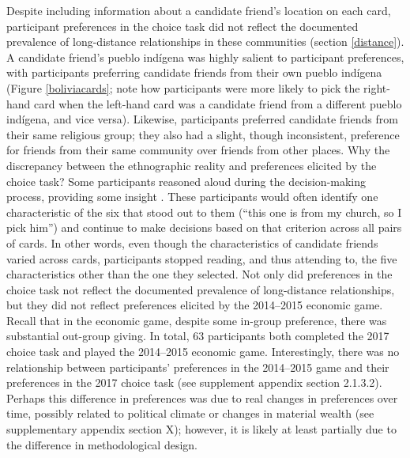 \documentclass[bibauthoryear]{aa}
\begin{document}
	Despite including information about a candidate friend's location on each card, participant preferences in the choice task did not reflect the documented prevalence of long-distance relationships in these communities (section \ref{distance}). A candidate friend's pueblo ind\'igena was highly salient to participant preferences, with participants preferring candidate friends from their own pueblo ind\'igena (Figure \ref{boliviacards}; note how participants were more likely to pick the right-hand card when the left-hand card was a candidate friend from a different pueblo ind\'igena, and vice versa). Likewise, participants preferred candidate friends from their same religious group; they also had a slight, though inconsistent, preference for friends from their same community over friends from other places. Why the discrepancy between the ethnographic reality and preferences elicited by the choice task? Some participants reasoned aloud during the decision-making process, providing some insight \citep{bernard2017research}. These participants would often identify one characteristic of the six that stood out to them (``this one is from my church, so I pick him'') and continue to make decisions based on that criterion across all pairs of cards. In other words, even though the characteristics of candidate friends varied across cards, participants stopped reading, and thus attending to, the five characteristics other than the one they selected. Not only did preferences in the choice task not reflect the documented prevalence of long-distance relationships, but they did not reflect preferences elicited by the 2014--2015 economic game. Recall that in the economic game, despite some in-group preference, there was substantial out-group giving. In total, 63 participants both completed the 2017 choice task and played the 2014--2015 economic game. Interestingly, there was no relationship between participants' preferences in the 2014--2015 game and their preferences in the 2017 choice task (see supplement appendix section 2.1.3.2). Perhaps this difference in preferences was due to real changes in preferences over time, possibly related to political climate or changes in material wealth (see supplementary appendix section X); however, it is likely at least partially due to the difference in methodological design.
	
\end{document}
